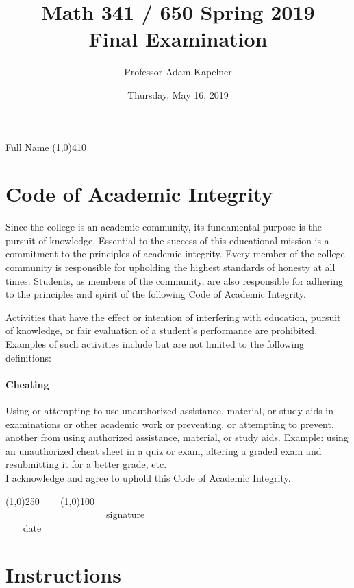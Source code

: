 \documentclass[12pt]{article}
\title{Math 341 / 650 Spring 2019 \\ Final Examination}
\author{Professor Adam Kapelner}
\date{Thursday, May 16, 2019}
\begin{document}
\maketitle

\noindent Full Name \line(1,0){410}

\thispagestyle{empty}

\section*{Code of Academic Integrity}

\footnotesize
Since the college is an academic community, its fundamental purpose is the pursuit of knowledge. Essential to the success of this educational mission is a commitment to the principles of academic integrity. Every member of the college community is responsible for upholding the highest standards of honesty at all times. Students, as members of the community, are also responsible for adhering to the principles and spirit of the following Code of Academic Integrity.

Activities that have the effect or intention of interfering with education, pursuit of knowledge, or fair evaluation of a student's performance are prohibited. Examples of such activities include but are not limited to the following definitions:

\paragraph{Cheating} Using or attempting to use unauthorized assistance, material, or study aids in examinations or other academic work or preventing, or attempting to prevent, another from using authorized assistance, material, or study aids. Example: using an unauthorized cheat sheet in a quiz or exam, altering a graded exam and resubmitting it for a better grade, etc.
\\

\noindent I acknowledge and agree to uphold this Code of Academic Integrity. \\

\begin{center}
\line(1,0){250} ~~~ \line(1,0){100}\\
~~~~~~~~~~~~~~~~~~~~~signature~~~~~~~~~~~~~~~~~~~~~~~~~~~~~~~~~~~~~~~~~~~~~ date
\end{center}

\normalsize

\section*{Instructions}
\end{document}
